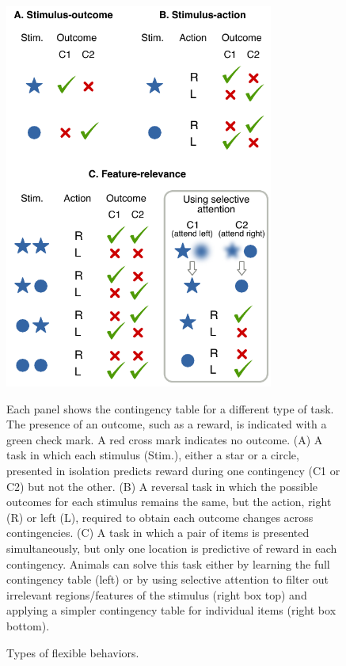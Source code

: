 \begin{figure}[hp]
  \begin{center}
    \includegraphics[height=5in]{figures/chapter5/figure_tasks}%
  \end{center}
\caption{Types of flexible behaviors.}{Each panel shows the contingency table for a different type of task. The presence of an outcome, such as a reward, is indicated with a green check mark. A red cross mark indicates no outcome. (A) A task in which each stimulus (Stim.), either a star or a circle, presented in isolation predicts reward during one contingency (C1 or C2) but not the other. (B) A reversal task in which the possible outcomes for each stimulus remains the same, but the action, right (R) or left (L), required to obtain each outcome changes across contingencies. (C) A task in which a pair of items is presented simultaneously, but only one location is predictive of reward in each contingency. Animals can solve this task either by learning the full contingency table (left) or by using selective attention to filter out irrelevant regions/features of the stimulus (right box top) and applying a simpler contingency table for individual items (right box bottom). 
}
\end{figure}


